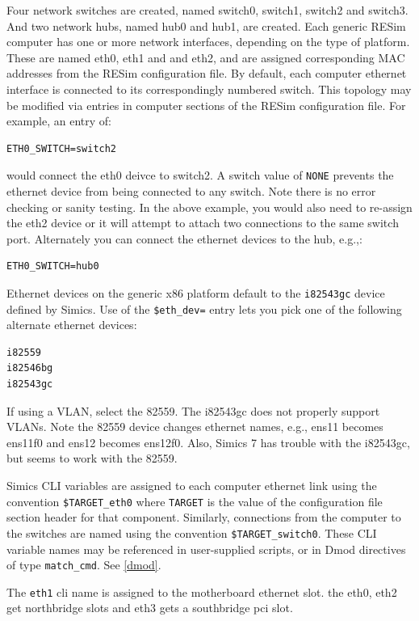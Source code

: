 \documentclass[titlepage]{article}
\begin{document}
Four network switches are created, named switch0, switch1, switch2 and switch3. And two network hubs, named hub0 and hub1, are created.  
Each generic RESim computer has one or more network interfaces,
depending on the type of platform.
These are named eth0, eth1 and and eth2, and are assigned corresponding MAC addresses from the
RESim configuration file. By default, each computer ethernet interface is connected to its correspondingly numbered switch.
This topology may be modified via entries in computer sections of the RESim configuration file.  For example, an entry of:
\begin{verbatim}
ETH0_SWITCH=switch2
\end{verbatim}
\noindent would connect the eth0 deivce to switch2.  A switch value of {\tt NONE} prevents the ethernet device from being connected
to any switch.  Note there is no error checking or sanity testing.  In the above example, you would also need to re-assign the eth2 device
or it will attempt to attach two connections to the same switch port.
Alternately you can connect the ethernet devices to the hub, e.g.,:
\begin{verbatim}
ETH0_SWITCH=hub0
\end{verbatim}

Ethernet devices on the generic x86 platform default to the {\tt i82543gc} device defined by Simics.  Use of the {\tt \$eth\_dev=} 
entry lets you pick one of the following alternate ethernet devices:
\begin{verbatim}
i82559
i82546bg
i82543gc
\end{verbatim}

If using a VLAN, select the 82559.  The i82543gc does not properly support VLANs.
Note the 82559 device changes ethernet names, e.g., ens11 becomes ens11f0 and ens12 becomes ens12f0.
Also, Simics 7 has trouble with the i82543gc, but seems to work with the 82559.

Simics CLI variables are assigned to each computer ethernet link using the convention {\tt \$TARGET\_eth0} where {\tt TARGET}
is the value of the configuration file section header for that component.  Similarly, connections from the computer to the switches 
are named using the convention {\tt \$TARGET\_switch0}.  These CLI variable names may be referenced in user-supplied scripts, or in 
Dmod directives of type {\tt match\_cmd}.  See \ref{dmod}.

The {\tt eth1} cli name is assigned to the motherboard ethernet slot. the eth0, eth2 get northbridge slots and eth3 gets a southbridge pci slot.
\end{document}
